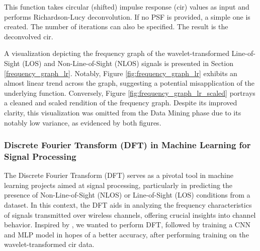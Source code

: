 This function takes circular (shifted) impulse response (\gls{cir}) values as input and performs Richardson-Lucy deconvolution. If no PSF is provided, a simple one is created. The number of iterations can also be specified. The result is the deconvolved \gls{cir}.

A visualization depicting the frequency graph of the wavelet-transformed Line-of-Sight (LOS) and Non-Line-of-Sight (NLOS) signals is presented in Section \ref{frequency_graph_lr}. Notably, Figure \ref{fig:frequency_graph_lr} exhibits an almost linear trend across the graph, suggesting a potential misapplication of the underlying function. Conversely, Figure \ref{fig:frequency_graph_lr_scaled} portrays a cleaned and scaled rendition of the frequency graph. Despite its improved clarity, this visualization was omitted from the Data Mining phase due to its notably low variance, as evidenced by both figures.

\subsubsection{Discrete Fourier Transform (DFT) in Machine Learning for Signal Processing}

The Discrete Fourier Transform (DFT) serves as a pivotal tool in machine learning projects aimed at signal processing, particularly in predicting the presence of Non-Line-of-Sight (NLOS) or Line-of-Sight (LOS) conditions from a dataset. In this context, the DFT aids in analyzing the frequency characteristics of signals transmitted over wireless channels, offering crucial insights into channel behavior. Inspired by \cite{8682194}, we wanted to perform DFT, followed by training a CNN and MLP model in hopes of a better accuracy, after performing training on the wavelet-transformed \gls{cir} data.

